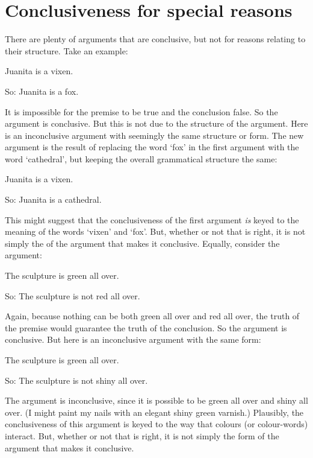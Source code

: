 \section{Conclusiveness for special reasons}
There are plenty of arguments that are conclusive, but not for reasons relating to their structure. Take an example:
	\begin{earg}
		\item[] Juanita is a vixen.
		\item[So:] Juanita is a fox.
	\end{earg}
It is impossible for the premise to be true and the conclusion false. So the argument is conclusive. But this is not due to the structure of the argument. Here is an inconclusive argument with seemingly the same structure or form. The new argument is the result of replacing the word `fox' in the first argument with the word `cathedral', but keeping the overall grammatical structure the same:
	\begin{earg}
		\item[] Juanita is a vixen.
		\item[So:] Juanita is a cathedral.
	\end{earg}
This might suggest that the conclusiveness of the first argument \emph{is} keyed to the meaning of the words `vixen' and `fox'. But, whether or not that is right, it is not simply the  of the argument that makes it conclusive. Equally, consider the argument:
	\begin{earg}
		\item[] The sculpture is green all over.
		\item[So:] The sculpture is not red all over. 
	\end{earg}
Again, because nothing can be both green all over and red all over, the truth of the premise would guarantee the truth of the conclusion. So the argument is conclusive. But here is an inconclusive argument with the same form:
	\begin{earg}
		\item[] The sculpture is green all over.
		\item[So:] The sculpture is not shiny all over.
	\end{earg}
The argument is inconclusive, since it is possible to be green all over and shiny all over. (I might paint my nails with an elegant shiny green varnish.) Plausibly, the conclusiveness of this argument is keyed to the way that colours (or colour-words) interact. But, whether or not that is right, it is not simply the form of the argument that makes it conclusive. 


